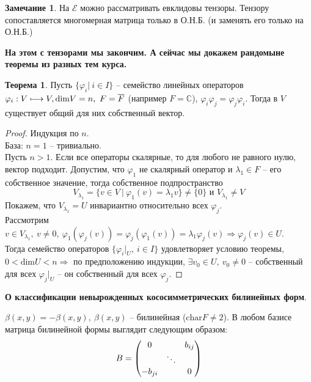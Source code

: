 \documentclass[a4paper, 12pt]{article}
\theoremstyle{definition}
\newtheorem*{theorem}{Теорема}
\newtheorem*{remark}{Замечание}
\begin{document}
    \begin{remark}
        На $\mathcal{E}$ можно рассматривать евклидовы тензоры. Тензору сопоставляется многомерная матрица только в О.Н.Б. (и заменять его только на О.Н.Б.)
    \end{remark}
    \textbf{На этом с тензорами мы закончим. А сейчас мы докажем рандомыне теоремы из разных тем курса.}
    \begin{theorem}
        Пусть $\{\varphi_i|\ i \in I\}$ -- семейство линейных операторов $\varphi_i: V \longmapsto V,\\\text{dim}V = n,\ F = \overline{F}$ (например $F = \mathbb{C}$), $\varphi_i \varphi_j = \varphi_j \varphi_i$. Тогда в $V$ существует общий для них собственный вектор.
    \end{theorem}
    \begin{proof}
        Индукция по $n$.\\
        База: $n = 1$ -- тривиально.\\
        Пусть $n > 1$. Если все операторы скалярные, то для любого не равного нулю, вектор подходит. Допустим, что $\varphi_1$ не скалярный оператор и $\lambda_1 \in F$ -- его собственное значение, тогда собственное подпространство $$V_{\lambda_1} = \{v \in V\ |\ \varphi_1(v) = \lambda_1 v\} \neq \{0\}\text{ и } V_{\lambda_1}\neq V$$
        Покажем, что $V_{\lambda_1} = U$ инвариантно относительно всех $\varphi_j$.\\
        Рассмотрим $v \in V_{\lambda_1},\ v \neq 0,\ \varphi_1(\varphi_j(v)) = \varphi_j(\varphi_1(v)) = \lambda_1\varphi_j(v) \Longrightarrow \varphi_j(v) \in U$.\\
        Тогда семейство операторов $\{\varphi_i|_U,\ i \in I\}$ удовлетворяет условию теоремы,\\ $0 < \text{dim}U < n \Longrightarrow $ по предположению индукции, $\exists v_0 \in U,\ v_0 \neq 0$ -- собственный для всех $\varphi_j|_U$ -- он собственный  для всех $\varphi_j$.

    \end{proof}
    \begin{center}
        \textbf{О классификации невырожденных кососимметрических билинейных форм}. 
    \end{center}
        $\beta(x,y) = - \beta(x,y),\ \beta(x,y)$ -- билинейная ($\text{char}F \neq 2$). В любом базисе матрица билинейной формы выглядит следующим образом:
        $$B = \begin{pmatrix}
            0 & \null & b_{ij}\\
            \null & \ddots & \null\\
            -b_{ji} & \null & 0
        \end{pmatrix}$$   
\end{document}
